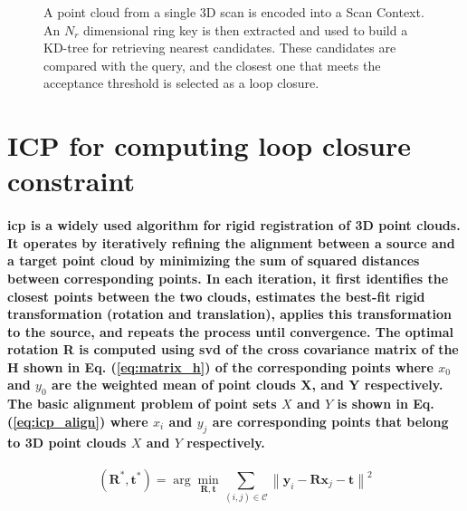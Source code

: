 \begin{figure}
{
}
\caption{A point cloud from a single 3D scan is encoded into a Scan Context. An $N_{r}$ dimensional ring key is then extracted and used to build a KD-tree for retrieving nearest candidates. These candidates are compared with the query, and the closest one that meets the acceptance threshold is selected as a loop closure\cite{kim2018scan}.}
\end{figure}


\section{ICP for computing loop closure constraint}
\paragraph{\textnormal{\gls{icp} \cite{4767965} is a widely used algorithm for rigid registration of 3D point clouds. It operates by iteratively refining the alignment between a source and a target point cloud by minimizing the sum of squared distances between corresponding points. In each iteration, it first identifies the closest points between the two clouds, estimates the best-fit rigid transformation (rotation and translation), applies this transformation to the source, and repeats the process until convergence. The optimal rotation R is computed using \gls{svd} \cite{golub1971singular} of the cross covariance matrix of the $\textbf{H}$  shown in Eq. (\ref{eq:matrix_h}) of the corresponding points where $x_0$ and $y_0$ are the weighted mean of point clouds X, and Y respectively. The basic alignment problem of point sets $X$ and $Y$ is shown in Eq. (\ref{eq:icp_align}) where $x_i$ and $y_j$ are corresponding points that belong to 3D point clouds $X$ and $Y$ respectively. }}
\begin{equation}
	(\mathbf{R}^*, \mathbf{t}^*) = \arg\min_{\mathbf{R}, \mathbf{t}} \sum_{(i,j)\in \mathcal{C}} \left\| \mathbf{y}_i - \mathbf{R} \mathbf{x}_j - \mathbf{t} \right\|^2
	\label{eq:icp_align}
\end{equation}

